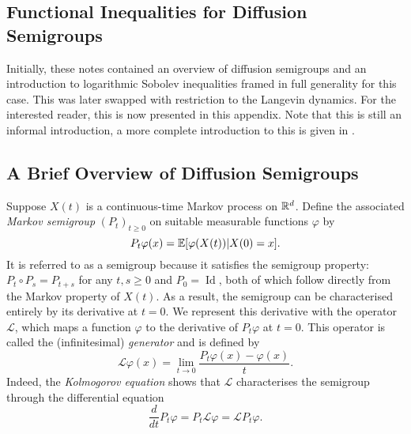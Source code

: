 \documentclass{article}
\newcommand{\Bcal}[1]{\mathcal{#1}}
\begin{document}
\begin{appendices}
\section{Functional Inequalities for Diffusion Semigroups}\label{sec:app_semi}
Initially, these notes contained an overview of diffusion semigroups and an introduction to logarithmic Sobolev inequalities framed in full generality for this case. This was later swapped with restriction to the Langevin dynamics. For the interested reader, this is now presented in this appendix. Note that this is still an informal introduction, a more complete introduction to this is given in
\cite{Bakry2014AnalysisOperators}.
\subsection{A Brief Overview of Diffusion Semigroups}
Suppose \(X(t)\) is a continuous-time Markov process on \(\Bbb{R}^d\). Define the associated \textit{Markov semigroup} \((P_t)_{t \geq 0}\) on suitable measurable functions \(\varphi\) by
\begin{equation*}
    P_t \varphi(x) = \Bbb{E} [ \varphi(X(t)) | X(0) = x].
\end{equation*}
It is referred to as a semigroup because it satisfies the semigroup property: \(P_t \circ P_s = P_{t + s}\) for any \(t,s \geq 0\) and \(P_0 = \operatorname{Id}\), both of which follow directly from the Markov property of \(X(t)\). As a result, the semigroup can be characterised entirely by its derivative at \(t=0\). We represent this derivative with the operator \(\Bcal{L}\), which maps a function \(\varphi\) to the derivative of \(P_t \varphi\) at \(t=0\). This operator is called the (infinitesimal) \textit{generator} and is defined by
\begin{equation*}
    \Bcal{L} \varphi(x) = \lim_{t \to 0} \frac{P_t \varphi(x) - \varphi(x)}{t}.
\end{equation*}
Indeed, the \textit{Kolmogorov equation} shows that \(\Bcal{L}\) characterises the semigroup through the differential equation
\begin{equation}\label{eq:semi_kolm}
    \frac{d}{dt}P_t \varphi = P_t \Bcal{L} \varphi = \Bcal{L} P_t \varphi.
\end{equation}


\end{appendices}
\end{document}
